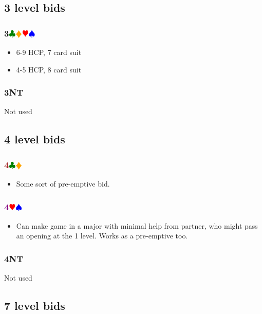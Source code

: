 \documentclass{article}
\newcommand{\Hs}{\textcolor{Red}{$\varheart$}}
\newcommand{\Ss}{\textcolor{Blue}{$\spadesuit$}}
\newcommand{\Ds}{\textcolor{Orange}{$\vardiamond$}}
\newcommand{\Cs}{\textcolor{Green}{$\clubsuit$}}
\newcommand{\NTs}{\textbf{\footnotesize{NT}}}
\newcommand{\NT}[1]{\textbf{#1\NTs}}
\newcommand{\suits}[1]{\textbf{#1}\Cs\Ds\Hs\Ss}
\newcommand{\minors}[1]{\textcolor{Brown}{\textbf{#1}}\Cs\Ds}
\newcommand{\majors}[1]{\textcolor{Purple}{\textbf{#1}}\Hs\Ss}
\begin{document}
\subsection{3 level bids}

\subsubsection{\suits{3}}

\begin{itemize}
\item 6-9 HCP, 7 card suit
\item 4-5 HCP, 8 card suit
\end{itemize}

\subsubsection{\NT{3}}

Not used

\subsection{4 level bids}

\subsubsection{\minors{4}}

\begin{itemize}
\item Some sort of pre-emptive bid.
\end{itemize}

\subsubsection{\majors{4}}

\begin{itemize}
\item Can make game in a major with minimal help from partner, who might pass an opening at the 1 level. Works as a pre-emptive too.
\end{itemize}

\subsubsection{\NT{4}}

Not used

\subsection{7 level bids}
\end{document}
